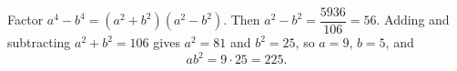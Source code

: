 Factor $a^4-b^4=(a^2+b^2)(a^2-b^2)$. Then $a^2-b^2=\dfrac{5936}{106}=56$. Adding and subtracting $a^2+b^2=106$ gives $a^2=81$ and $b^2=25$, so $a=9$, $b=5$, and
\[ab^2=9\cdot25=\boxed{225}.\]
